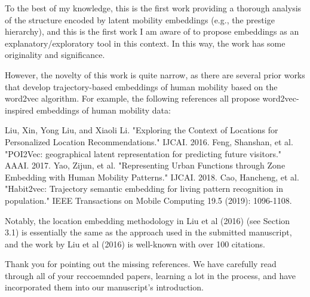 \documentclass[12pt,a4paper]{article}
\newcommand{\response}[1]{{\leavevmode\noindent #1}}
\newcommand{\rcomment}[1]{%
\vspace{10pt}
\begin{tcolorbox}[colback=black!3,colframe=white!45!black]
#1
\end{tcolorbox}
}
\begin{document}
\rcomment{%
To the best of my knowledge, this is the first work providing a thorough analysis of the structure encoded by latent mobility embeddings (e.g., the prestige hierarchy), and this is the first work I am aware of to propose embeddings as an explanatory/exploratory tool in this context. In this way, the work has some originality and significance.

However, the novelty of this work is quite narrow, as there are several prior works that develop trajectory-based embeddings of human mobility based on the word2vec algorithm. For example, the following references all propose word2vec-inspired embeddings of human mobility data:

Liu, Xin, Yong Liu, and Xiaoli Li. "Exploring the Context of Locations for Personalized Location Recommendations." IJCAI. 2016.
Feng, Shanshan, et al. "POI2Vec: geographical latent representation for predicting future visitors." AAAI. 2017.
Yao, Zijun, et al. "Representing Urban Functions through Zone Embedding with Human Mobility Patterns." IJCAI. 2018.
Cao, Hancheng, et al. "Habit2vec: Trajectory semantic embedding for living pattern recognition in population." IEEE Transactions on Mobile Computing 19.5 (2019): 1096-1108.

Notably, the location embedding methodology in Liu et al (2016) (see Section 3.1) is essentially the same as the approach used in the submitted manuscript, and the work by Liu et al (2016) is well-known with over 100 citations.
}

\response{%
Thank you for pointing out the missing references. 
We have carefully read through all of your reccoemnded papers, learning a lot in the process, and have incorporated them into our manuscript's introduction.
}
\end{document}
